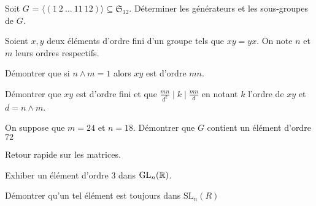 \documentclass{report}
\begin{document}
\begin{exo}
    Soit \(G\) = \(\langle(1\ 2\ \dots\ 11\ 12)\rangle\subseteq\mathfrak{S}_{12}\).
    Déterminer les générateurs et les sous-groupes de \(G\).
\end{exo}

\begin{exo}
    Soient \(x,y\) deux éléments d'ordre fini d'un groupe tels que \(xy=yx\). On note
    \(n\) et \(m\) leurs ordres respectifs.
    \begin{q}{1}
        Démontrer que si \(n\land m = 1\) alors \(xy\) est d'ordre \(mn\).
    \end{q}
    \begin{q}{2}
        Démontrer que \(xy\) est d'ordre fini et que \(\frac{mn}{d^2} \mid k \mid \frac{mn}{d}\)
        en notant \(k\) l'ordre de \(xy\) et \(d=n\land m\).
    \end{q}
    \begin{q}{3}
        On suppose que \(m=24\) et \(n=18\). Démontrer que \(G\) contient un
        élément d'ordre \(72\)
    \end{q}
\end{exo}

\begin{exo}
    Retour rapide sur les matrices.
    \begin{q}{1}
        Exhiber un élément d'ordre \(3\) dans \(\mathrm{GL}_n(\mathbb{R})\).
    \end{q}
    \begin{q}{2}
        Démontrer qu'un tel élément est toujours dans \(\text{SL}_n(R)\)
    \end{q}
\end{exo}
\end{document}
